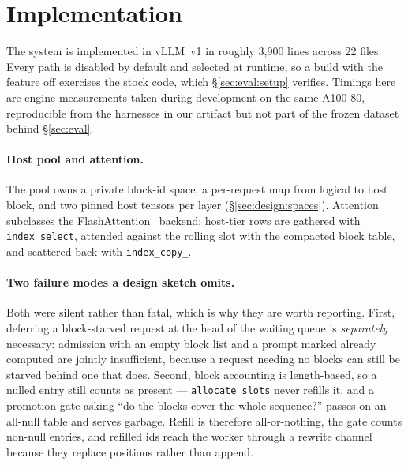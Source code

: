 %
%

\section{Implementation}
\label{sec:impl}

The system is implemented in vLLM~v1 in roughly 3{,}900 lines across 22 files.
Every path is disabled by default and selected at runtime, so a build with the
feature off exercises the stock code, which \S\ref{sec:eval:setup} verifies.
Timings here are engine measurements taken during development on the same A100-80,
reproducible from the harnesses in our artifact but not part of the frozen dataset
behind \S\ref{sec:eval}.

\paragraph{Host pool and attention.}
\label{sec:impl:pool}
The pool owns a private block-id space, a per-request map from logical to host
block, and two pinned host tensors per layer (\S\ref{sec:design:spaces}).
Attention subclasses the FlashAttention~\cite{flashattention2} backend: host-tier
rows are gathered with \texttt{index\_select}, attended against the rolling slot
with the compacted block table, and scattered back with \texttt{index\_copy\_}.

\paragraph{Two failure modes a design sketch omits.} Both were silent rather than
fatal, which is why they are worth reporting. First, deferring a block-starved
request at the head of the waiting queue is \emph{separately} necessary: admission
with an empty block list and a prompt marked already computed are jointly
insufficient, because a request needing no blocks can still be starved behind one
that does. Second, block accounting is length-based, so a nulled entry still counts
as present --- \texttt{allocate\_slots} never refills it, and a promotion gate asking
``do the blocks cover the whole sequence?'' passes on an all-null table and serves
garbage. Refill is therefore all-or-nothing, the gate counts non-null entries, and
refilled ids reach the worker through a rewrite channel because they replace
positions rather than append.

